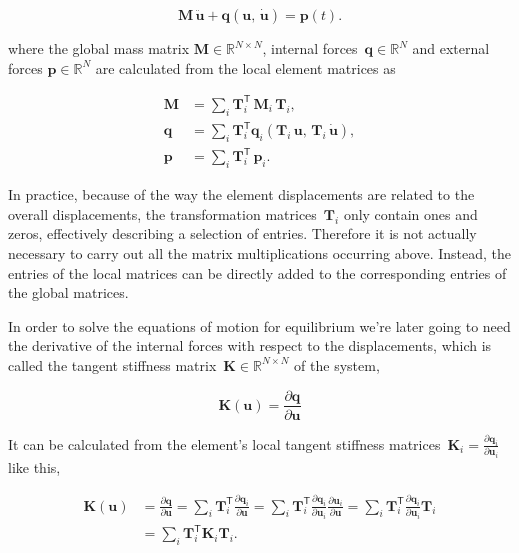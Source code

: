 \begin{equation}
\boldsymbol{M}\,\ddot{\boldsymbol{u}} + \boldsymbol{q}(\boldsymbol{u},\,\dot{\boldsymbol{u}}) = \boldsymbol{p}(t).
\end{equation}

where the global mass matrix $\boldsymbol{M} \in \mathbb{R}^{N \times N}$, internal forces~$\boldsymbol{q} \in \mathbb{R}^{N}$ and external forces $\boldsymbol{p} \in \mathbb{R}^{N}$ are calculated from the local element matrices as

\begin{align}
\boldsymbol{M} &= \sum_i\boldsymbol{T}_i^\mathsf{T}\, \boldsymbol{M}_i\,\boldsymbol{T}_i,\\
\boldsymbol{q} &= \sum_i\boldsymbol{T}_i^\mathsf{T} \boldsymbol{q}_i(\boldsymbol{T}_i\,\boldsymbol{u},\,\boldsymbol{T}_i\,\dot{\boldsymbol{u}}),\\
\boldsymbol{p} &= \sum_i\boldsymbol{T}_i^\mathsf{T}\,\boldsymbol{p}_i.
\end{align}

In practice, because of the way the element displacements are related to the overall displacements, the transformation matrices~$\boldsymbol{T}_i$ only contain ones and zeros, effectively describing a selection of entries.
Therefore it is not actually necessary to carry out all the matrix multiplications occurring above.
Instead, the entries of the local matrices can be directly added to the corresponding entries of the global matrices.

In order to solve the equations of motion for equilibrium we're later going to need the derivative of the internal forces with respect to the displacements, which is called the tangent stiffness matrix~$\boldsymbol{K} \in \mathbb{R}^{N \times N}$ of the system,

\begin{equation}
\boldsymbol{K}(\boldsymbol{u}) = \frac{\partial \boldsymbol{q}}{\partial \boldsymbol{u}}
\end{equation}

It can be calculated from the element's local tangent stiffness matrices~$\boldsymbol{K}_i = \frac{\partial \boldsymbol{q}_i}{\partial \boldsymbol{u}_i}$ like this,

\begin{align*}
\boldsymbol{K}(\boldsymbol{u}) &= \frac{\partial \boldsymbol{q}}{\partial \boldsymbol{u}} = \sum_i\boldsymbol{T}_i^\mathsf{T} \frac{\partial \boldsymbol{q}_i}{\partial \boldsymbol{u}} = \sum_i\boldsymbol{T}_i^\mathsf{T} \frac{\partial \boldsymbol{q}_i}{\partial \boldsymbol{u}_i} \frac{\partial \boldsymbol{u}_i}{\partial \boldsymbol{u}} = \sum_i\boldsymbol{T}_i^\mathsf{T} \frac{\partial \boldsymbol{q}_i}{\partial \boldsymbol{u}_i} \boldsymbol{T}_i\\
&= \sum_i\boldsymbol{T}_i^\mathsf{T} \boldsymbol{K}_i \boldsymbol{T}_i.
\end{align*}


